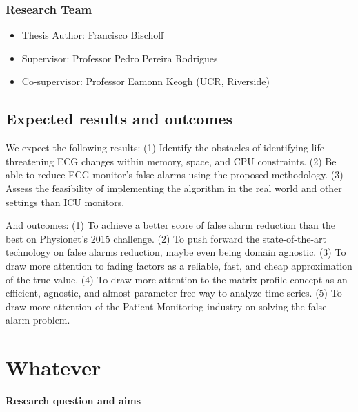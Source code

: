 \documentclass[12pt,twoside]{fmupthesis}
\providecommand{\tightlist}{%
  \setlength{\itemsep}{0pt}\setlength{\parskip}{0pt}}
\begin{document}
\hypertarget{research-team}{%
\subsection{Research Team}\label{research-team}}
\begin{itemize}
\tightlist
\item
  Thesis Author: Francisco Bischoff
\item
  Supervisor: Professor Pedro Pereira Rodrigues
\item
  Co-supervisor: Professor Eamonn Keogh (UCR, Riverside)
\end{itemize}
\hypertarget{expected-results-and-outcomes}{%
\section{Expected results and outcomes}\label{expected-results-and-outcomes}}

We expect the following results: (1) Identify the obstacles of identifying life-threatening ECG changes within memory,
space, and CPU constraints. (2) Be able to reduce ECG monitor's false alarms using the proposed methodology. (3) Assess
the feasibility of implementing the algorithm in the real world and other settings than ICU monitors.

And outcomes: (1) To achieve a better score of false alarm reduction than the best on Physionet's 2015 challenge. (2) To
push forward the state-of-the-art technology on false alarms reduction, maybe even being domain agnostic. (3) To draw
more attention to fading factors as a reliable, fast, and cheap approximation of the true value. (4) To draw more
attention to the matrix profile concept as an efficient, agnostic, and almost parameter-free way to analyze time series.
(5) To draw more attention of the Patient Monitoring industry on solving the false alarm problem.

\hypertarget{whatever}{%
\chapter{Whatever}\label{whatever}}

\textbf{Research question and aims}
\end{document}
